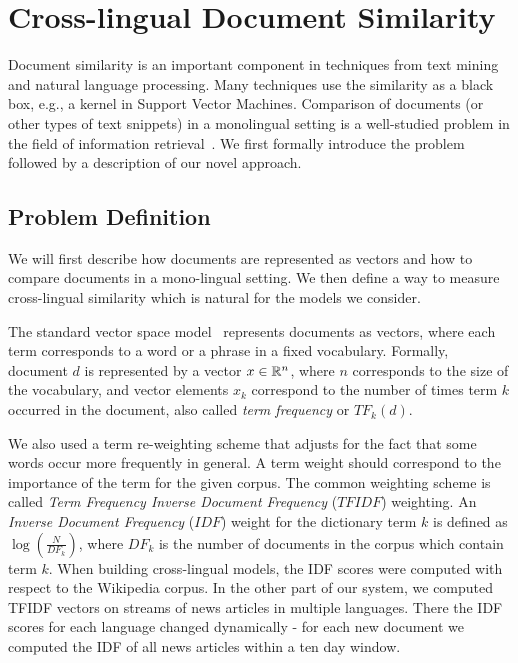 %
\chapter{Cross-lingual Document Similarity}\label{chap:crosslingual}

Document similarity is an important component in techniques from text mining and natural language processing.
Many techniques use the similarity as a black box, e.g., a kernel in Support Vector Machines.
Comparison of documents (or other types of text snippets) in a monolingual setting is a
well-studied problem in the field of information retrieval~\cite{Salton88term-weightingapproaches}.
We first formally introduce the problem followed by a description of our novel approach.

\section{Problem Definition}\label{chap:crosslingual:problem}
We will first describe how documents are represented as vectors and how to compare documents in
a mono-lingual setting. We then define a way to measure cross-lingual similarity which is natural
for the models we consider.

The standard vector space model~\cite{Salton88term-weightingapproaches} represents documents as
vectors, where each term corresponds to a word or a phrase in a fixed vocabulary. Formally,
document $d$ is represented by a vector $x \in \mathbb{R}^n$, where $n$ corresponds to the size
of the vocabulary, and vector elements $x_k$ correspond to the number of times term $k$
occurred in the document, also called \emph{term frequency} or $TF_k(d)$.

We also used a term re-weighting scheme that adjusts for the fact that some words occur
more frequently in general. A term weight should correspond to the importance of the term
for the given corpus. The common weighting scheme is called \emph{Term Frequency Inverse
Document Frequency} ($TFIDF$) weighting. An \emph{Inverse Document Frequency} ($IDF$) weight
for the dictionary term $k$ is defined as $\log\left( \frac{N}{DF_k} \right)$, where
$DF_k$ is the number of documents in the corpus which contain term $k$.
When building cross-lingual models, the IDF scores were computed with respect to the
Wikipedia corpus. In the other part of our system, we computed TFIDF vectors on streams
of news articles in multiple languages. There the IDF scores for each language changed
dynamically - for each new document we computed the IDF of all news articles within
a ten day window.

